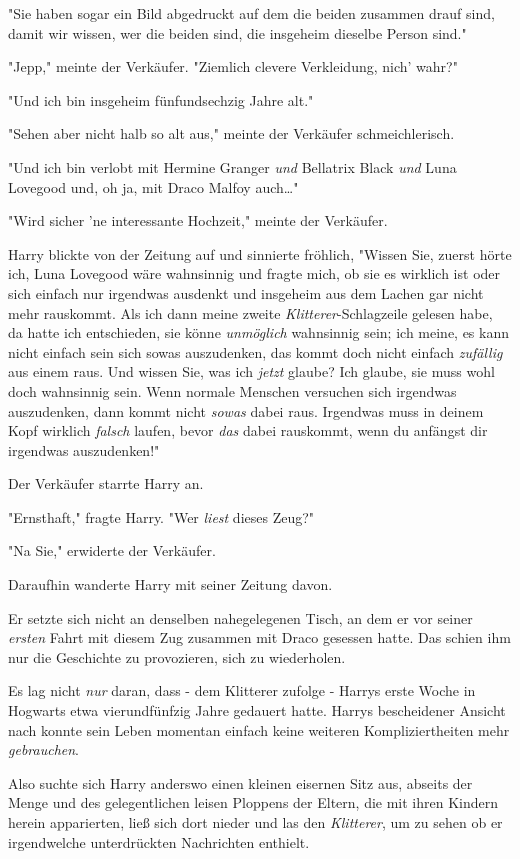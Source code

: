 {"Sie haben sogar ein Bild abgedruckt auf dem die beiden zusammen drauf sind, damit wir wissen, wer die beiden sind, die insgeheim dieselbe Person sind."

"Jepp," meinte der Verkäufer. "Ziemlich clevere Verkleidung, nich' wahr?"

"Und ich bin insgeheim fünfundsechzig Jahre alt."

"Sehen aber nicht halb so alt aus," meinte der Verkäufer schmeichlerisch.

"Und ich bin verlobt mit Hermine Granger \emph{und} Bellatrix Black \emph{und} Luna Lovegood und, oh ja, mit Draco Malfoy auch…"

"Wird sicher 'ne interessante Hochzeit," meinte der Verkäufer.

Harry blickte von der Zeitung auf und sinnierte fröhlich, "Wissen Sie, zuerst hörte ich, Luna Lovegood wäre wahnsinnig und fragte mich, ob sie es wirklich ist oder sich einfach nur irgendwas ausdenkt und insgeheim aus dem Lachen gar nicht mehr rauskommt. Als ich dann meine zweite \emph{Klitterer}-Schlagzeile gelesen habe, da hatte ich entschieden, sie könne \emph{unmöglich} wahnsinnig sein; ich meine, es kann nicht einfach sein sich sowas auszudenken, das kommt doch nicht einfach \emph{zufällig} aus einem raus. Und wissen Sie, was ich \emph{jetzt} glaube? Ich glaube, sie muss wohl doch wahnsinnig sein. Wenn normale Menschen versuchen sich irgendwas auszudenken, dann kommt nicht \emph{sowas} dabei raus. Irgendwas muss in deinem Kopf wirklich \emph{falsch} laufen, bevor \emph{das} dabei rauskommt, wenn du anfängst dir irgendwas auszudenken!"

Der Verkäufer starrte Harry an.

"Ernsthaft," fragte Harry. "Wer \emph{liest} dieses Zeug?"

"Na Sie," erwiderte der Verkäufer.

Daraufhin wanderte Harry mit seiner Zeitung davon.

Er setzte sich nicht an denselben nahegelegenen Tisch, an dem er vor seiner \emph{ersten} Fahrt mit diesem Zug zusammen mit Draco gesessen hatte. Das schien ihm nur die Geschichte zu provozieren, sich zu wiederholen.

Es lag nicht \emph{nur} daran, dass - dem Klitterer zufolge - Harrys erste Woche in Hogwarts etwa vierundfünfzig Jahre gedauert hatte. Harrys bescheidener Ansicht nach konnte sein Leben momentan einfach keine weiteren Kompliziertheiten mehr \emph{gebrauchen}.

Also suchte sich Harry anderswo einen kleinen eisernen Sitz aus, abseits der Menge und des gelegentlichen leisen Ploppens der Eltern, die mit ihren Kindern herein apparierten, ließ sich dort nieder und las den \emph{Klitterer}, um zu sehen ob er irgendwelche unterdrückten Nachrichten enthielt.

}

